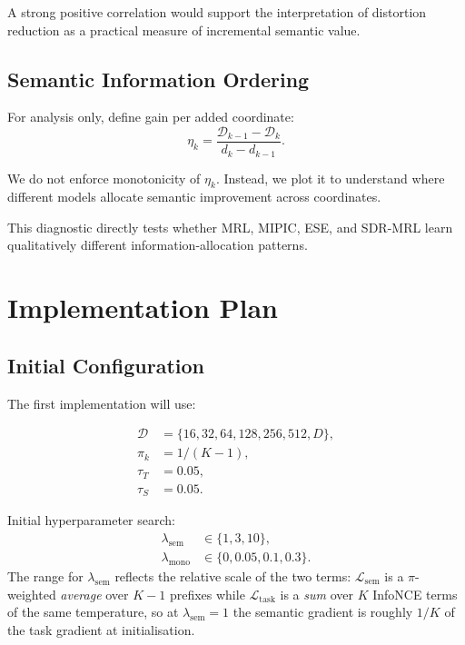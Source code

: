 \documentclass[11pt]{article}
\newcommand{\cL}{\mathcal{L}}
\newcommand{\cD}{\mathcal{D}}
\begin{document}
A strong positive correlation would support the interpretation of distortion reduction as a practical measure of incremental semantic value.


\subsection{Semantic Information Ordering}

For analysis only, define gain per added coordinate:
\begin{equation}
    \eta_k
    =
    \frac{
        \cD_{k-1}-\cD_k
    }{
        d_k-d_{k-1}
    }.
\end{equation}

We do not enforce monotonicity of $\eta_k$.
Instead, we plot it to understand where different models allocate semantic improvement across coordinates.

This diagnostic directly tests whether MRL, MIPIC, ESE, and SDR-MRL learn qualitatively different information-allocation patterns.


\section{Implementation Plan}

\subsection{Initial Configuration}

The first implementation will use:

\begin{align}
\mathcal D
&=
\{16,32,64,128,256,512,D\},
\\
\pi_k
&=
1/(K-1),
\\
\tau_T
&=
0.05,
\\
\tau_S
&=
0.05.
\end{align}

Initial hyperparameter search:
\begin{align}
\lambda_{\mathrm{sem}}
&\in
\{1,3,10\},
\\
\lambda_{\mathrm{mono}}
&\in
\{0,0.05,0.1,0.3\}.
\end{align}
The range for $\lambda_{\mathrm{sem}}$ reflects the relative scale of the two terms: $\cL_{\mathrm{sem}}$ is a $\pi$-weighted \emph{average} over $K-1$ prefixes while $\cL_{\mathrm{task}}$ is a \emph{sum} over $K$ InfoNCE terms of the same temperature, so at $\lambda_{\mathrm{sem}}=1$ the semantic gradient is roughly $1/K$ of the task gradient at initialisation.
\end{document}
